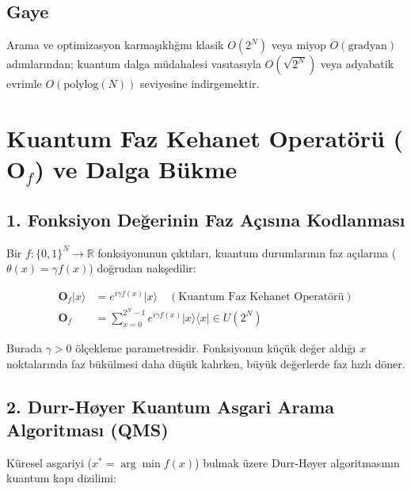 \documentclass[11pt, a4paper]{article}
\begin{document}
\subsection{Gaye}
Arama ve optimizasyon karmaşıklığını klasik $O(2^N)$ veya miyop $O(\text{gradyan})$ adımlarından; kuantum dalga müdahalesi vasıtasıyla $O(\sqrt{2^N})$ veya adyabatik evrimle $O(\text{polylog}(N))$ seviyesine indirgemektir.

\section{Kuantum Faz Kehanet Operatörü ($\mathbf{O}_f$) ve Dalga Bükme}

\subsection{1. Fonksiyon Değerinin Faz Açısına Kodlanması}
Bir $f: \{0,1\}^N \to \mathbb{R}$ fonksiyonunun çıktıları, kuantum durumlarının faz açılarına ($\theta(x) = \gamma f(x)$) doğrudan nakşedilir:

\begin{align}
\mathbf{O}_f |x\rangle &= e^{i \gamma f(x)} |x\rangle \quad (\text{Kuantum Faz Kehanet Operatörü}) \\
\mathbf{O}_f &= \sum_{x=0}^{2^N-1} e^{i \gamma f(x)} |x\rangle \langle x| \in U(2^N)
\end{align}

Burada $\gamma > 0$ ölçekleme parametresidir. Fonksiyonun küçük değer aldığı $x$ noktalarında faz bükülmesi daha düşük kalırken, büyük değerlerde faz hızlı döner.

\subsection{2. Durr-Høyer Kuantum Asgari Arama Algoritması (QMS)}
Küresel asgariyi ($x^* = \arg\min f(x)$) bulmak üzere Durr-Høyer algoritmasının kuantum kapı dizilimi:
\end{document}
